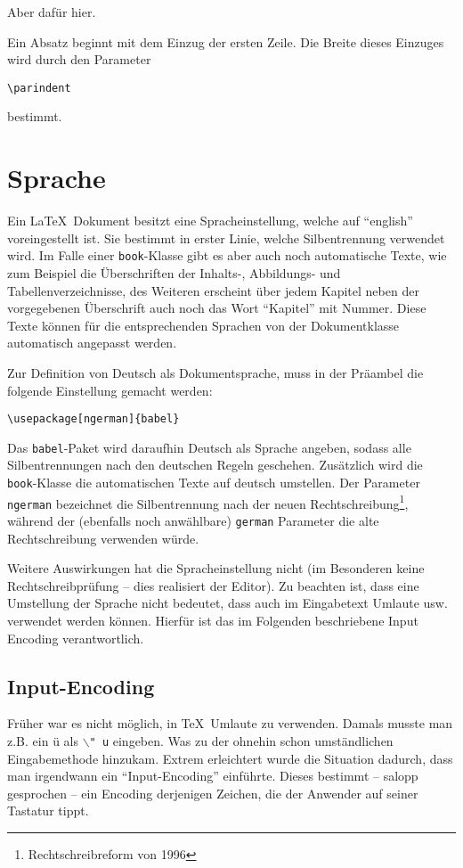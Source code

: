 Aber dafür hier.
\normalfont

Ein Absatz beginnt mit dem Einzug der ersten Zeile. Die Breite dieses Einzuges wird durch den Parameter
\begin{verbatim}
\parindent
\end{verbatim}
bestimmt.

\section{Sprache}

Ein \LaTeX\ Dokument besitzt eine Spracheinstellung, welche auf "`english"' voreingestellt ist. Sie bestimmt in erster Linie, welche Silbentrennung verwendet wird. Im Falle einer \texttt{book}-Klasse gibt es aber auch noch automatische Texte, wie zum Beispiel die Überschriften der Inhalts-, Abbildungs- und Tabellenverzeichnisse, des Weiteren erscheint über jedem Kapitel neben der vorgegebenen Überschrift auch noch das Wort "`Kapitel"' mit Nummer. Diese Texte können für die entsprechenden Sprachen von der Dokumentklasse automatisch angepasst werden. 

Zur Definition von Deutsch als Dokumentsprache, muss in der Präambel die folgende Einstellung gemacht werden:
\begin{verbatim}
\usepackage[ngerman]{babel}
\end{verbatim}
Das \texttt{babel}-Paket wird daraufhin Deutsch als Sprache angeben, sodass alle Silbentrennungen nach den deutschen Regeln geschehen. Zusätzlich wird die \texttt{book}-Klasse die automatischen Texte auf deutsch umstellen. Der Parameter \texttt{ngerman} bezeichnet die Silbentrennung nach der neuen Rechtschreibung\footnote{Rechtschreibreform von 1996}, während der (ebenfalls noch anwählbare) \texttt{german} Parameter die alte Rechtschreibung verwenden würde. 

Weitere Auswirkungen hat die Spracheinstellung nicht (im Besonderen keine Rechtschreibprüfung -- dies realisiert der Editor). Zu beachten ist, dass eine Umstellung der Sprache nicht bedeutet, dass auch im Eingabetext Umlaute usw. verwendet werden können. Hierfür ist das im Folgenden beschriebene Input Encoding verantwortlich.

\subsection{Input-Encoding}

Früher war es nicht möglich, in \TeX\ Umlaute zu verwenden. Damals musste man z.B. ein ü als \texttt{$\backslash$"\,u} eingeben. Was zu der ohnehin schon umständlichen Eingabemethode hinzukam. Extrem erleichtert wurde die Situation dadurch, dass man irgendwann ein "`Input-Encoding"' einführte. Dieses bestimmt -- salopp gesprochen -- ein Encoding derjenigen Zeichen, die der Anwender auf seiner Tastatur tippt. 

